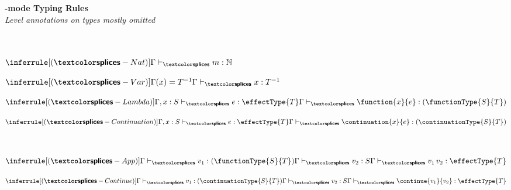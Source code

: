 \begin{figure}
  \begin{source-desc}
    {\large\textbf{\splicemode{}-mode Typing Rules}}\\
    \textit{Level annotations on types mostly omitted}\\
    \vspace{2mm}\\
    \\
    \begin{center} 
    \begin{minipage}[t]{0.2\textwidth}
      \centering
      $\inferrule[(\splicemode{}-Nat)]
      { \\ }
      {\stypejudge{m}{\compiletimetype{\mathbb{N}}}}$
      \end{minipage}%
  \begin{minipage}[t]{0.2\textwidth}
    \centering
  $\inferrule[(\splicemode{}-Var)]
  {\Gamma(x) = \compiletimetype{T^{-1}}}
  {\stypejudge{x}{\compiletimetype{T^{-1}}}}$
  \end{minipage}%
  \begin{minipage}[t]{0.3\textwidth}
    \centering
  $\inferrule[(\splicemode{}-Lambda)]
  {\stypejudge[\Gamma, x:\compiletimetype{S}]{e}{\effectType{\compiletimetype{T}}}}
  {\stypejudge{\function{x}{e}}{\compiletimetype{(\functionType{\compiletimetype{S}}{\compiletimetype{T}})}}}$
  \end{minipage}%
  \begin{minipage}[t]{0.3\textwidth}
  \centering
$\inferrule[(\splicemode{}-Continuation)]
  {\stypejudge[\Gamma, x:\compiletimetype{S}]{e}{\effectType{\compiletimetype{T}}}}
  {\stypejudge{\continuation{x}{e}}{\compiletimetype{(\continuationType{\compiletimetype{S}}{\compiletimetype{T}})}}}$
\end{minipage}
  
  \vspace{5mm}
\end{center}

\\
\begin{center}
    
  \begin{minipage}[t]{0.5\textwidth}
    \centering
  $\inferrule[(\splicemode{}-App)]
    {\stypejudge{v_1}{\compiletimetype{(\functionType{\compiletimetype{S}}{\compiletimetype{T}})}} \\ \stypejudge{v_2}{\compiletimetype{S}}}
    {\stypejudge{v_1 \, v_2}{\effectType{\compiletimetype{T}}}}$
  \end{minipage}%
  \begin{minipage}[t]{0.5\textwidth}
    \centering
  $\inferrule[(\splicemode{}-Continue)]
    {\stypejudge{v_1}{\compiletimetype{(\continuationType{\compiletimetype{S}}{\compiletimetype{T}})}} \\ \stypejudge{v_2}{\compiletimetype{S}}}
    {\stypejudge{\continue{v_1}{v_2}}{\effectType{\compiletimetype{T}}}}$
  \end{minipage}


\end{center}
\end{source-desc}
\end{figure}
